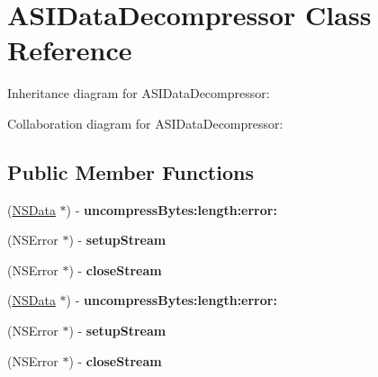 \hypertarget{interface_a_s_i_data_decompressor}{
\section{\-A\-S\-I\-Data\-Decompressor \-Class \-Reference}
\label{interface_a_s_i_data_decompressor}
}


\-Inheritance diagram for \-A\-S\-I\-Data\-Decompressor\-:


\-Collaboration diagram for \-A\-S\-I\-Data\-Decompressor\-:
\subsection*{\-Public \-Member \-Functions}
\begin{DoxyCompactItemize}
\item 
\hypertarget{interface_a_s_i_data_decompressor_a23fa125f2bb93caadbbd6bc2d30015d7}{
(\hyperlink{class_n_s_data}{\-N\-S\-Data} $\ast$) -\/ {\bfseries uncompress\-Bytes\-:length\-:error\-:}}
\label{interface_a_s_i_data_decompressor_a23fa125f2bb93caadbbd6bc2d30015d7}

\item 
\hypertarget{interface_a_s_i_data_decompressor_af009d857fb418cf74fd7839923146bac}{
(\-N\-S\-Error $\ast$) -\/ {\bfseries setup\-Stream}}
\label{interface_a_s_i_data_decompressor_af009d857fb418cf74fd7839923146bac}

\item 
\hypertarget{interface_a_s_i_data_decompressor_ab64e961a9c1f08f2d33fa9b6a1142abb}{
(\-N\-S\-Error $\ast$) -\/ {\bfseries close\-Stream}}
\label{interface_a_s_i_data_decompressor_ab64e961a9c1f08f2d33fa9b6a1142abb}

\item 
\hypertarget{interface_a_s_i_data_decompressor_a23fa125f2bb93caadbbd6bc2d30015d7}{
(\hyperlink{class_n_s_data}{\-N\-S\-Data} $\ast$) -\/ {\bfseries uncompress\-Bytes\-:length\-:error\-:}}
\label{interface_a_s_i_data_decompressor_a23fa125f2bb93caadbbd6bc2d30015d7}

\item 
\hypertarget{interface_a_s_i_data_decompressor_af009d857fb418cf74fd7839923146bac}{
(\-N\-S\-Error $\ast$) -\/ {\bfseries setup\-Stream}}
\label{interface_a_s_i_data_decompressor_af009d857fb418cf74fd7839923146bac}

\item 
\hypertarget{interface_a_s_i_data_decompressor_ab64e961a9c1f08f2d33fa9b6a1142abb}{
(\-N\-S\-Error $\ast$) -\/ {\bfseries close\-Stream}}
\label{interface_a_s_i_data_decompressor_ab64e961a9c1f08f2d33fa9b6a1142abb}


\end{DoxyCompactItemize}
